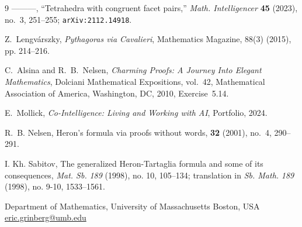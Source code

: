 \documentclass[10.5pt]
{amsart}
\begin{document}
\begin{thebibliography}{9}
———,
``Tetrahedra with congruent facet pairs,''
\textit{Math. Intelligencer} \textbf{45} (2023), no.~3, 251--255;
\texttt{arXiv:2112.14918}.

Z.~Lengv{\'a}rszky, \emph{Pythagoras via Cavalieri},
Mathematics Magazine, 88(3) (2015), pp. 214--216.

C.~Alsina and R.~B.~Nelsen,
\emph{Charming Proofs: A Journey Into Elegant Mathematics},
Dolciani Mathematical Expositions, vol.~42,
Mathematical Association of America, Washington, DC, 2010,
Exercise~5.14.


E.~Mollick,
\textit{Co-Intelligence: Living and Working with AI},
Portfolio, 2024.

R.~B. Nelsen,
\newblock Heron's formula via proofs without words,
 {\bf 32} (2001), no.~4, 290--291.

I. Kh. Sabitov, The generalized Heron-Tartaglia formula and some of its consequences, {\it Mat. Sb.} {\it 189} (1998), no. 10, 105--134; translation in {\it Sb. Math.} {\it 189} (1998), no. 9-10, 1533--1561.


\end{thebibliography}

 
\bigskip\noindent
Department of Mathematics, University of Massachusetts Boston,   USA \\
\qquad \href{mailto:eric.grinberg@umb.edu}{eric.grinberg@umb.edu} 

\bigskip

\end{document}
